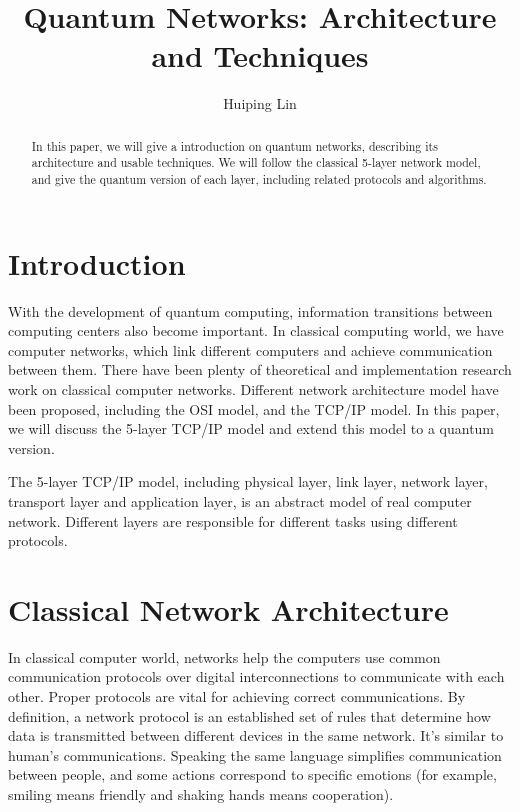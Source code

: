 \documentclass[10pt]{article}
\begin{document}
\title{\textbf{Quantum Networks: Architecture and Techniques}}

\author{Huiping Lin}

 
\maketitle
\begin{abstract}
    In this paper, we will give a introduction on quantum networks, describing its architecture and usable techniques. We will follow the classical 5-layer network model, and give the quantum version of each layer, including related protocols and algorithms.
\end{abstract}

\section{Introduction}
With the development of quantum computing, information transitions between computing centers also become important. In classical computing world, we have computer networks, which link different computers and achieve communication between them. There have been plenty of theoretical and implementation research work on classical computer networks. Different network architecture model have been proposed, including the OSI model, and the TCP/IP model. In this paper, we will discuss the 5-layer TCP/IP model and extend this model to a quantum version.

The 5-layer TCP/IP model, including physical layer, link layer, network layer, transport layer and application layer, is an abstract model of real computer network. Different layers are responsible for different tasks using different protocols.

\section{Classical Network Architecture}

In classical computer world, networks help the computers use common communication protocols over digital interconnections to communicate with each other. Proper protocols are vital for achieving correct communications. By definition, a network protocol is an established set of rules that determine how data is transmitted between different devices in the same network. It's similar to human's communications. Speaking the same language simplifies communication between people, and some actions correspond to specific emotions (for example, smiling means friendly and shaking hands means cooperation). 
\end{document}
